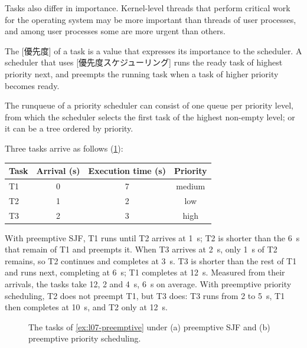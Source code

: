 \documentclass[../main.tex]{subfiles}
\begin{document}
Tasks also differ in importance.  Kernel-level threads that perform
critical work for the operating system may be more important than threads
of user processes, and among user processes some are more urgent than
others.

\begin{definition}[Priority]
  The [優先度] of a task is a value that expresses its
  importance to the scheduler.  A scheduler that uses
  [優先度スケジューリング] runs the ready task of
  highest priority next, and preempts the running task when a task of higher
  priority becomes ready.
\end{definition}

The runqueue of a priority scheduler can consist of one queue per priority
level, from which the scheduler selects the first task of the highest
non-empty level; or it can be a tree ordered by priority.

\begin{example}
  \label{ex:l07-preemptive}
  Three tasks arrive as follows (\cref{fig:l07-preemptive}):

  \begin{center}\small
  \begin{tabular}{@{}lccc@{}}
    \toprule
    Task & Arrival (s) & Execution time (s) & Priority \\
    \midrule
    T1 & 0 & 7 & medium \\
    T2 & 1 & 2 & low \\
    T3 & 2 & 3 & high \\
    \bottomrule
  \end{tabular}
  \end{center}

  With preemptive SJF, T1 runs until T2 arrives at \SI{1}{\second}; T2 is
  shorter than the \SI{6}{\second} that remain of T1 and preempts it.  When
  T3 arrives at \SI{2}{\second}, only \SI{1}{\second} of T2 remains, so T2
  continues and completes at \SI{3}{\second}.  T3 is shorter than the rest
  of T1 and runs next, completing at \SI{6}{\second}; T1 completes at
  \SI{12}{\second}.  Measured from their arrivals, the tasks take 12, 2 and
  \SI{4}{\second}, \SI{6}{\second} on average.  With preemptive priority
  scheduling, T2 does not preempt T1, but T3 does: T3 runs from 2 to
  \SI{5}{\second}, T1 then completes at \SI{10}{\second}, and T2 only at
  \SI{12}{\second}.
\end{example}

\begin{figure}[htbp]
  \centering
  
  \caption{The tasks of \cref{ex:l07-preemptive} under (a) preemptive SJF
    and (b) preemptive priority scheduling.}
  \label{fig:l07-preemptive}
\end{figure}
\end{document}
